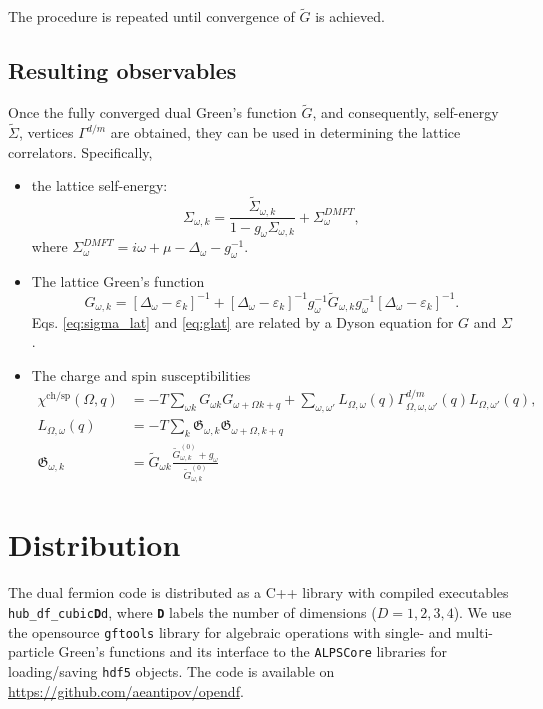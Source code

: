 \documentclass[3p,times,procedia]{elsarticle}
\begin{document}
The procedure is repeated until convergence of $\tilde G$ is achieved. 

\subsection{Resulting observables}
Once the fully converged dual Green's function $\tilde G$, and consequently, self-energy $\tilde \Sigma$, vertices $\Gamma^{d/m}$ are obtained, they can be used in determining the lattice correlators. Specifically, 
\begin{itemize}
\item the lattice self-energy: 
\begin{equation}\label{eq:sigma_lat}
\Sigma_{\omega, k} = \frac{\tilde \Sigma_{\omega, k}}{1 - g_\omega \Sigma_{\omega, k}} + \Sigma^{DMFT}_{\omega},
\end{equation}
where $\Sigma^{DMFT}_{\omega} = i\omega + \mu - \Delta_{\omega} - g_\omega^{-1}$. 
\item The lattice Green's function
\begin{equation}\label{eq:glat}
G_{\omega,k} = \left[\Delta_{\omega} - \varepsilon_{k}\right]^{-1} + \left[\Delta_{\omega} - \varepsilon_{k}\right]^{-1} g_{\omega}^{-1} \tilde G_{\omega, k} g_{\omega}^{-1} \left[\Delta_{\omega} - \varepsilon_{k}\right]^{-1}.
\end{equation}
Eqs. \ref{eq:sigma_lat} and \ref{eq:glat} are related by a Dyson equation for $G$ and $\Sigma$. 
\item The charge and spin susceptibilities
\begin{align}
\chi^{\mathrm{ch/sp}} (\Omega, q) & = -T \sum_{\omega k} G_{\omega k} G_{\omega+\Omega k+q} + \sum_{\omega,\omega'} L_{\Omega, \omega}(q) \Gamma^{d/m}_{\Omega,\omega,\omega'}(q) L_{\Omega, \omega'}(q), \\
L_{\Omega, \omega}(q) & = -T \sum_k \mathfrak{G}_{\omega,k} \mathfrak{G}_{\omega + \Omega,k + q} \\
\mathfrak{G}_{\omega,k} & = \tilde G_{\omega k} \frac{\tilde G^{(0)}_{\omega, k} + g_\omega}{\tilde G^{(0)}_{\omega, k}}
\end{align}
\end{itemize}

\section{Distribution}\label{sec:imp}
The dual fermion code is distributed as a C++ library with compiled executables \texttt{hub\_df\_cubic{\bf D}d}, where \texttt{\bf D} labels the number of dimensions ($D=1,2,3,4$). We use the opensource \texttt{gftools} library \cite{gftools} for algebraic operations with single- and multi-particle Green's functions and its interface to the \texttt{ALPSCore} libraries \cite{ALPSCore} for loading/saving \texttt{hdf5} objects. The code is available on \url{https://github.com/aeantipov/opendf}.
\end{document}
